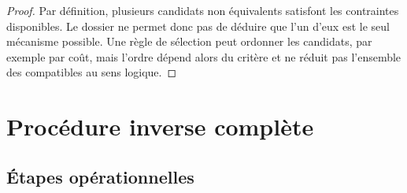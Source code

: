 \documentclass[11pt,oneside]{book}
\theoremstyle{definition}
\theoremstyle{remark}
\newcommand{\1}{\mathbf 1}
\begin{document}
\begin{proof}
Par définition, plusieurs candidats non équivalents satisfont les contraintes disponibles. Le dossier ne permet donc pas de déduire que l'un d'eux est le seul mécanisme possible. Une règle de sélection peut ordonner les candidats, par exemple par coût, mais l'ordre dépend alors du critère et ne réduit pas l'ensemble des compatibles au sens logique.\end{proof}

\chapter{Procédure inverse complète}
\section{Étapes opérationnelles}
\end{document}
